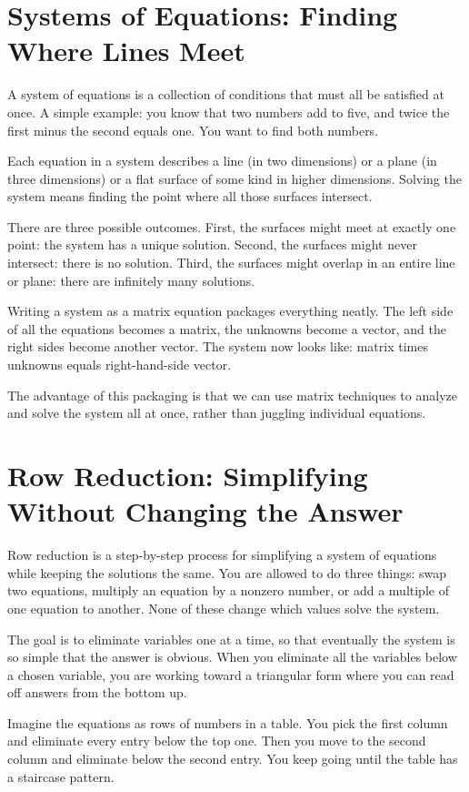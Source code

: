 \documentclass[11pt]{article}
\begin{document}
\section*{Systems of Equations: Finding Where Lines Meet}

A system of equations is a collection of conditions that must all be satisfied at once. A simple example: you know that two numbers add to five, and twice the first minus the second equals one. You want to find both numbers.

Each equation in a system describes a line (in two dimensions) or a plane (in three dimensions) or a flat surface of some kind in higher dimensions. Solving the system means finding the point where all those surfaces intersect.

There are three possible outcomes. First, the surfaces might meet at exactly one point: the system has a unique solution. Second, the surfaces might never intersect: there is no solution. Third, the surfaces might overlap in an entire line or plane: there are infinitely many solutions.

Writing a system as a matrix equation packages everything neatly. The left side of all the equations becomes a matrix, the unknowns become a vector, and the right sides become another vector. The system now looks like: matrix times unknowns equals right-hand-side vector.

The advantage of this packaging is that we can use matrix techniques to analyze and solve the system all at once, rather than juggling individual equations.

\section*{Row Reduction: Simplifying Without Changing the Answer}

Row reduction is a step-by-step process for simplifying a system of equations while keeping the solutions the same. You are allowed to do three things: swap two equations, multiply an equation by a nonzero number, or add a multiple of one equation to another. None of these change which values solve the system.

The goal is to eliminate variables one at a time, so that eventually the system is so simple that the answer is obvious. When you eliminate all the variables below a chosen variable, you are working toward a triangular form where you can read off answers from the bottom up.

Imagine the equations as rows of numbers in a table. You pick the first column and eliminate every entry below the top one. Then you move to the second column and eliminate below the second entry. You keep going until the table has a staircase pattern.
\end{document}
